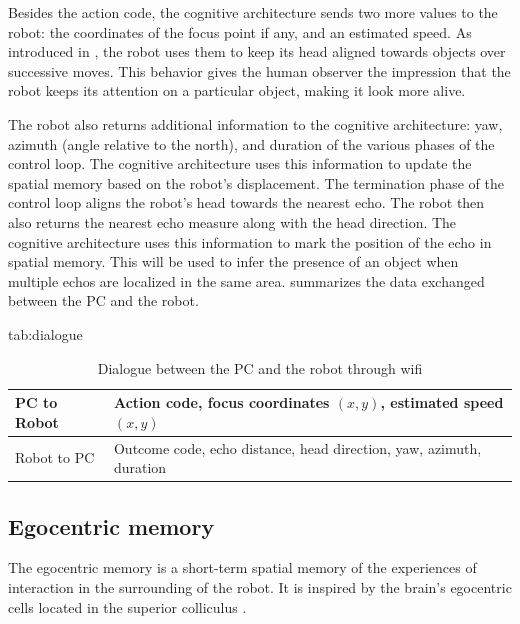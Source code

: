 \documentclass[pmlr]{jmlr}%
\begin{document}
Besides the action code, the cognitive architecture sends two more values to the robot: the coordinates of the focus point if any, and an estimated speed. 
As introduced in , the robot uses them to keep its head aligned towards objects over successive moves. 
This behavior gives the human observer the impression that the robot keeps its attention on a particular object, making it look more alive. 

The robot also returns additional information to the cognitive architecture: yaw, azimuth (angle relative to the north), and duration of the various phases of the control loop. 
The cognitive architecture uses this information to update the spatial memory based on the robot's displacement. 
The termination phase of the control loop aligns the robot's head towards the nearest echo. 
The robot then also returns the nearest echo measure along with the head direction. 
The cognitive architecture uses this information to mark the position of the echo in spatial memory. 
This will be used to infer the presence of an object when multiple echos are localized in the same area. 
 summarizes the data exchanged between the PC and the robot.

\begin{table}[htbp]
	\floatconts
	{tab:dialogue}%
	{\caption{Dialogue between the PC and the robot through wifi}}%
	{\begin{tabular}{l|l}
			\toprule
			PC to Robot & Action code, focus coordinates $(x, y)$, estimated speed $(x, y)$\\
			\midrule
			Robot to PC & Outcome code, echo distance, head direction, yaw, azimuth, duration\\
			\bottomrule
	\end{tabular}}
\end{table}

\subsection{Egocentric memory}

The egocentric memory is a short-term spatial memory of the experiences of interaction in the surrounding of the robot. 
It is inspired by the brain's egocentric cells located in the superior colliculus \citep{grieves_representation_2017}.
\end{document}
